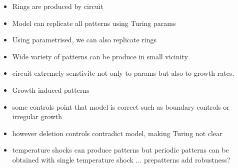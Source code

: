 \begin{itemize}
    \item Rings are produced by circuit
    \item Model can replicate all patterns using Turing params
    \item Using parametrised, we can also replicate rings
    \item Wide variety of patterns can be produce in small vicinity
    \item circuit extremely senstivite not only to params but also to growth rates.
    \item Growth induced patterns
    \item some controls point that model is correct such as boundary controls or irregular growth
    \item however deletion controls contradict model, making Turing not clear
    \item temperature shocks can produce patterns but periodic patterns can be obtained with single temperature shock ... prepatterns add robustness?

\end{itemize}




